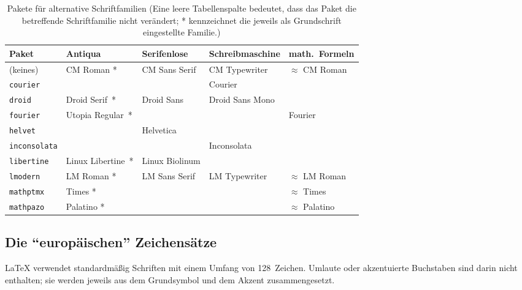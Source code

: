 \begin{table}[htb]
\caption[Pakete für alternative Schriftfamilien]
{Pakete für alternative Schriftfamilien \newline\small(Eine leere
Tabellenspalte bedeutet, dass das Paket die betreffende Schriftfamilie nicht 
verändert; * kennzeichnet die jeweils als Grundschrift eingestellte Familie.)}
\label{families}
{\footnotesize
\medskip
\renewcommand{\arraystretch}{1.5}
\begin{tabularx}{\textwidth}{@{}lxxxx@{}}
\toprule
Paket            & Antiqua    & Serifenlose   & Schreibmaschine  & math.\ Formeln\tabularnewline\midrule
(keines)         & CM Roman * & CM Sans Serif & CM Typewriter    & $\approx$ CM Roman\tabularnewline
\texttt{courier} &
                 &
                 & Courier 
                 & \tabularnewline
\texttt{droid}   & Droid Serif~*  & Droid Sans    & Droid Sans Mono &                  \tabularnewline
\texttt{fourier} & Utopia Regular~*    &               &                 & Fourier          \tabularnewline
\texttt{helvet}  & 
                 & Helvetica
                 &
                 & \tabularnewline
\texttt{inconsolata} &                 &                & Inconsolata    &                  \tabularnewline
\texttt{libertine} & Linux Libertine~* & Linux Biolinum &                &                  \tabularnewline
\texttt{lmodern} & LM Roman *          & LM Sans Serif & LM Typewriter & $\approx$ LM Roman \tabularnewline
\texttt{mathptmx}& Times *
                 &
                 &
                 & $\approx$ Times\tabularnewline
\texttt{mathpazo}& Palatino *
                 &
                 &
                 & $\approx$ Palatino\tabularnewline
\bottomrule                
\end{tabularx}
}
\end{table}


\subsection{Die "`europäischen"' Zeichensätze}
\LaTeX{} verwendet standardmäßig  Schriften mit einem Umfang von
128~Zeichen.  Umlaute oder akzentuierte Buchstaben sind darin nicht
enthalten; sie werden jeweils aus dem Grundsymbol und dem Akzent
zusammengesetzt.  

